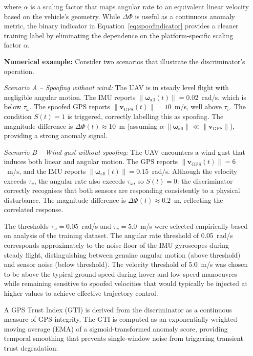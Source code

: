 \documentclass[electronics,article,accept,moreauthors]{Definitions/mdpi}
\begin{document}
where $\alpha$ is a scaling factor that maps angular rate to an equivalent linear velocity based on the vehicle's geometry. While $\Delta\Phi$ is useful as a continuous anomaly metric, the binary indicator in Equation~\ref{eq:spoofindicator} provides a cleaner training label by eliminating the dependence on the platform-specific scaling factor $\alpha$.

\textbf{Numerical example:} Consider two scenarios that illustrate the discriminator's operation.

\textit{Scenario A -- Spoofing without wind:} The UAV is in steady level flight with negligible angular motion. The IMU reports $\|\boldsymbol{\omega}_{\text{all}}(t)\| = 0.02$~rad/s, which is below $\tau_\omega$. The spoofed GPS reports $\|\mathbf{v}_{\text{GPS}}(t)\| = 10$~m/s, well above $\tau_v$. The condition $S(t) = 1$ is triggered, correctly labelling this as spoofing. The magnitude difference is $\Delta\Phi(t) \approx 10$~m (assuming $\alpha \cdot \|\boldsymbol{\omega}_{\text{all}}\| \ll \|\mathbf{v}_{\text{GPS}}\|$), providing a strong anomaly signal.

\textit{Scenario B -- Wind gust without spoofing:} The UAV encounters a wind gust that induces both linear and angular motion. The GPS reports $\|\mathbf{v}_{\text{GPS}}(t)\| = 6$~m/s, and the IMU reports $\|\boldsymbol{\omega}_{\text{all}}(t)\| = 0.15$~rad/s. Although the velocity exceeds $\tau_v$, the angular rate also exceeds $\tau_\omega$, so $S(t) = 0$: the discriminator correctly recognises that both sensors are responding consistently to a physical disturbance. The magnitude difference is $\Delta\Phi(t) \approx 0.2$~m, reflecting the correlated response.

The thresholds $\tau_\omega = 0.05$~rad/s and $\tau_v = 5.0$~m/s were selected empirically based on analysis of the training dataset. The angular rate threshold of 0.05~rad/s corresponds approximately to the noise floor of the IMU gyroscopes during steady flight, distinguishing between genuine angular motion (above threshold) and sensor noise (below threshold). The velocity threshold of 5.0~m/s was chosen to be above the typical ground speed during hover and low-speed manoeuvres while remaining sensitive to spoofed velocities that would typically be injected at higher values to achieve effective trajectory control.

A GPS Trust Index (GTI) is derived from the discriminator as a continuous measure of GPS integrity. The GTI is computed as an exponentially weighted moving average (EMA) of a sigmoid-transformed anomaly score, providing temporal smoothing that prevents single-window noise from triggering transient trust degradation:
\end{document}
